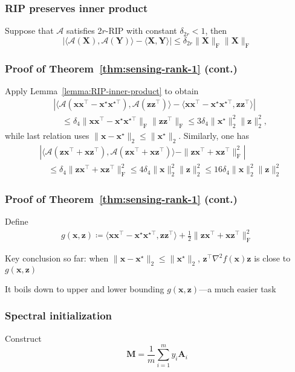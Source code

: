 \documentclass[compress,
mathserif,wide,%
]{beamer}
\begin{document}
\begin{frame}
	\frametitle{RIP preserves inner product}
	\begin{lemma}\label{lemma:RIP-inner-product}
	Suppose that $\mathcal{A}$ satisfies 2$r$-RIP with constant $\delta_{2r} < 1$, then 
	\[
		\left| \langle \mathcal{A}(\bm{X}), \mathcal{A}(\bm{Y}) \rangle - \langle \bm{X}, \bm{Y} \rangle \right| \leq \delta_{2r} \| \bm{X} \|_{\mathrm{F}} \| \bm{X} \|_{\mathrm{F}}
	\]
	\end{lemma}
\end{frame}

\begin{frame}
	\frametitle{Proof of Theorem~\ref{thm:sensing-rank-1} (cont.)}
	
	Apply Lemma~\ref{lemma:RIP-inner-product} to obtain
	\begin{align*}
		& \left|  \langle \mathcal{A} (\bm{x} \bm{x}^\top  - \bm{x}^{\star} \bm{x}^{\star \top}), \mathcal{A} (\bm{z} \bm{z}^\top ) \rangle - \langle \bm{x} \bm{x}^\top  - \bm{x}^{\star} \bm{x}^{\star \top}, \bm{z} \bm{z}^\top  \rangle \right| \\
		&\quad \leq \delta_{4} \| \bm{x} \bm{x}^\top  - \bm{x}^{\star} \bm{x}^{\star \top} \|_{\mathrm{F}} \| \bm{z} \bm{z}^\top \|_{\mathrm{F}}  \leq 3 \delta_{4} \| \bm{x}^{\star} \|_{2}^{2} \| \bm{z} \|_{2}^{2}, 
	\end{align*}
	while last relation uses $\|\bm{x} - \bm{x}^\star \|_{2} \leq \| \bm{x}^\star \|_{2}$. Similarly, one has
	\begin{align*}
		& \left|  \langle \mathcal{A} (\bm{z} \bm{x}^\top  + \bm{x} \bm{z}^{\top}), \mathcal{A} (\bm{z} \bm{x}^\top  + \bm{x} \bm{z}^{\top}) \rangle -  \| \bm{z} \bm{x}^\top  + \bm{x} \bm{z}^{\top} \|_{\mathrm{F}}^{2} \right| \\
		&\quad \leq \delta_{4} \| \bm{z} \bm{x}^\top  + \bm{x} \bm{z}^{\top} \|_{\mathrm{F}}^2 \leq 4 \delta_{4} \| \bm{x} \|_{2}^{2} \| \bm{z} \|_{2}^{2} \leq 16 \delta_{4} \| \bm{x} \|_{2}^{2} \| \bm{z} \|_{2}^{2}
	\end{align*}		
	
\end{frame}

\begin{frame}
	\frametitle{Proof of Theorem~\ref{thm:sensing-rank-1} (cont.)}
		Define
	\begin{align*}
		g(\bm{x}, \bm{z}) \coloneqq \langle \bm{x} \bm{x}^\top  - \bm{x}^{\star} \bm{x}^{\star \top}, \bm{z} \bm{z}^\top  \rangle + \frac{1}{2} \| \bm{z} \bm{x}^\top  + \bm{x} \bm{z}^{\top} \|_{\mathrm{F}}^{2}
		\end{align*}
		
		\vfill
		Key conclusion so far: when $\|\bm{x} - \bm{x}^\star \|_{2} \leq \| \bm{x}^\star \|_{2}$, $\bm{z}^\top  \nabla^2 f (\bm{x}) \bm{z}$ is close to $g(\bm{x}, \bm{z})$ 
		
		\vfill
		It boils down to upper and lower bounding $g(\bm{x}, \bm{z})$---a much easier task
\end{frame}

\begin{frame}
	\frametitle{Spectral initialization}
	Construct
	\[
	\bm{M} = \frac{1}{m} \sum_{i=1}^{m} y_i \bm{A}_{i}
	\]
\end{frame}
\end{document}
